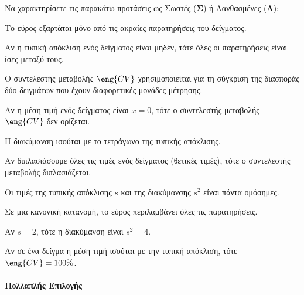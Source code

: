 \documentclass[11pt,a4paper,modern]{FFExercises}
\begin{document}
\askhsh
Να χαρακτηρίσετε τις παρακάτω προτάσεις ως Σωστές (\textbf{Σ}) ή Λανθασμένες (\textbf{Λ}):
\begin{alist}
    \item Το εύρος εξαρτάται μόνο από τις ακραίες παρατηρήσεις του δείγματος.
    \item Αν η τυπική απόκλιση ενός δείγματος είναι μηδέν, τότε όλες οι παρατηρήσεις είναι ίσες μεταξύ τους.
    \item Ο συντελεστής μεταβολής $\eng{CV}$ χρησιμοποιείται για τη σύγκριση της διασποράς δύο δειγμάτων που έχουν διαφορετικές μονάδες μέτρησης.
    \item Αν η μέση τιμή ενός δείγματος είναι $\bar{x} = 0$, τότε ο συντελεστής μεταβολής $\eng{CV}$ δεν ορίζεται.
    \item Η διακύμανση ισούται με το τετράγωνο της τυπικής απόκλισης.
    \item Αν διπλασιάσουμε όλες τις τιμές ενός δείγματος (θετικές τιμές), τότε ο συντελεστής μεταβολής διπλασιάζεται.
    \item Οι τιμές της τυπικής απόκλισης $s$ και της διακύμανσης $s^2$ είναι πάντα ομόσημες.
    \item Σε μια κανονική κατανομή, το εύρος περιλαμβάνει όλες τις παρατηρήσεις.
    \item Αν $s=2$, τότε η διακύμανση είναι $s^2=4$.
    \item Αν σε ένα δείγμα η μέση τιμή ισούται με την τυπική απόκλιση, τότε $\eng{CV} = 100\%$.
\end{alist}

\paragraph{Πολλαπλής Επιλογής}
\end{document}
